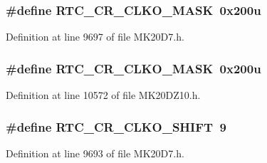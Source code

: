 \subsubsection[{\texorpdfstring{R\+T\+C\+\_\+\+C\+R\+\_\+\+C\+L\+K\+O\+\_\+\+M\+A\+SK}{RTC_CR_CLKO_MASK}}]{\setlength{\rightskip}{0pt plus 5cm}\#define R\+T\+C\+\_\+\+C\+R\+\_\+\+C\+L\+K\+O\+\_\+\+M\+A\+SK~0x200u}\hypertarget{group___r_t_c___register___masks_ga4c9ab830040b30f5ebc3e21f357e3d58}{}\label{group___r_t_c___register___masks_ga4c9ab830040b30f5ebc3e21f357e3d58}


Definition at line 9697 of file M\+K20\+D7.\+h.

\subsubsection[{\texorpdfstring{R\+T\+C\+\_\+\+C\+R\+\_\+\+C\+L\+K\+O\+\_\+\+M\+A\+SK}{RTC_CR_CLKO_MASK}}]{\setlength{\rightskip}{0pt plus 5cm}\#define R\+T\+C\+\_\+\+C\+R\+\_\+\+C\+L\+K\+O\+\_\+\+M\+A\+SK~0x200u}\hypertarget{group___r_t_c___register___masks_ga4c9ab830040b30f5ebc3e21f357e3d58}{}\label{group___r_t_c___register___masks_ga4c9ab830040b30f5ebc3e21f357e3d58}


Definition at line 10572 of file M\+K20\+D\+Z10.\+h.

\subsubsection[{\texorpdfstring{R\+T\+C\+\_\+\+C\+R\+\_\+\+C\+L\+K\+O\+\_\+\+S\+H\+I\+FT}{RTC_CR_CLKO_SHIFT}}]{\setlength{\rightskip}{0pt plus 5cm}\#define R\+T\+C\+\_\+\+C\+R\+\_\+\+C\+L\+K\+O\+\_\+\+S\+H\+I\+FT~9}\hypertarget{group___r_t_c___register___masks_ga0c53e02399574c63f5015cef513dddff}{}\label{group___r_t_c___register___masks_ga0c53e02399574c63f5015cef513dddff}


Definition at line 9693 of file M\+K20\+D7.\+h.

